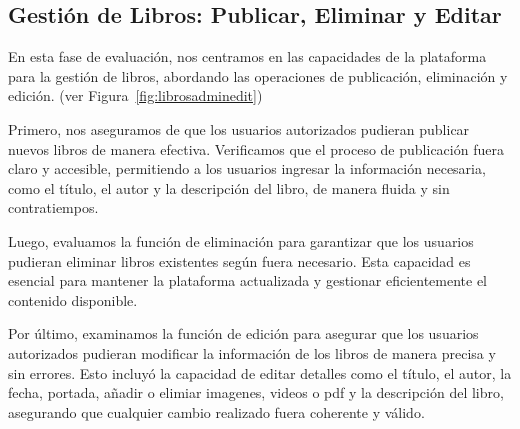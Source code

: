 \documentclass[a4paper, 12pt]{book}
\begin{document}
\subsection{Gestión de Libros: Publicar, Eliminar y Editar}
\label{sec:publish-delete-edit-books}

En esta fase de evaluación, nos centramos en las capacidades de la plataforma para la gestión de libros, abordando las operaciones de publicación, 
eliminación y edición. (ver Figura~\ref{fig:librosadminedit})

Primero, nos aseguramos de que los usuarios autorizados pudieran publicar nuevos libros de manera efectiva. Verificamos que el proceso de publicación 
fuera claro y accesible, permitiendo a los usuarios ingresar la información necesaria, como el título, el autor y la descripción del libro, de manera 
fluida y sin contratiempos.

Luego, evaluamos la función de eliminación para garantizar que los usuarios pudieran eliminar libros existentes según fuera necesario. Esta capacidad es 
esencial para mantener la plataforma actualizada y gestionar eficientemente el contenido disponible.

Por último, examinamos la función de edición para asegurar que los usuarios autorizados pudieran modificar la información de los libros de manera precisa 
y sin errores. Esto incluyó la capacidad de editar detalles como el título, el autor, la fecha, portada, añadir o elimiar imagenes, videos o pdf y la descripción 
del libro, asegurando que cualquier cambio realizado fuera coherente y válido.
\end{document}
